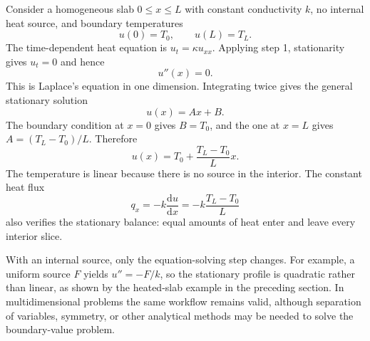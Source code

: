 \begin{example}
Consider a homogeneous slab $0\leq x\leq L$ with constant conductivity $k$, no internal heat source, and boundary temperatures
\begin{equation}
u(0)=T_0,\qquad u(L)=T_L.
\end{equation}
The time-dependent heat equation is $u_t=\kappa u_{xx}$. Applying step 1, stationarity gives $u_t=0$ and hence
\begin{equation}
u''(x)=0.
\end{equation}
This is Laplace's equation in one dimension. Integrating twice gives the general stationary solution
\begin{equation}
u(x)=A x+B.
\end{equation}
The boundary condition at $x=0$ gives $B=T_0$, and the one at $x=L$ gives $A=(T_L-T_0)/L$. Therefore
\begin{equation}
\boxed{u(x)=T_0+\frac{T_L-T_0}{L}x.}
\end{equation}
The temperature is linear because there is no source in the interior. The constant heat flux
\begin{equation}
q_x=-k\frac{\mathrm{d}u}{\mathrm{d}x}
=-k\frac{T_L-T_0}{L}
\end{equation}
also verifies the stationary balance: equal amounts of heat enter and leave every interior slice.
\end{example}

With an internal source, only the equation-solving step changes. For example, a uniform source $F$ yields $u''=-F/k$, so the stationary profile is quadratic rather than linear, as shown by the heated-slab example in the preceding section. In multidimensional problems the same workflow remains valid, although separation of variables, symmetry, or other analytical methods may be needed to solve the boundary-value problem.